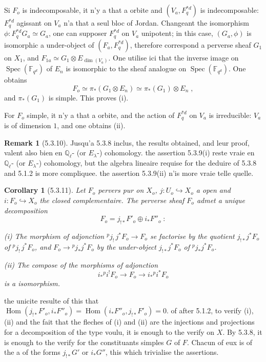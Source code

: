 \documentclass[12pt,a4paper]{article}
\theoremstyle{plain}
\newtheorem{corollary}[theorem]{Corollary}
\theoremstyle{definition}
\newtheorem{remark}[theorem]{Remark}
\theoremstyle{remark}
\DeclareMathOperator{\Hom}{Hom}
\DeclareMathOperator{\Spec}{Spec}
\newcommand{\FF}{\mathbb{F}}
\newcommand{\QQ}{\mathbb{Q}}
\begin{document}
Si $F_o$ is indecomposable, it n'y a that a orbite and $(V_a, F^{*d}_q)$ is indecomposable: $F^{*d}_q$ agissant on $V_a$ n'a that a seul bloc of Jordan. Changeant the isomorphism $\phi: F^{*d}_q G_a \simeq G_a$, one can supposer $F^{*d}_q$ on $V_a$ unipotent; in this case, $(G_a, \phi)$ is isomorphic a under-object of $(F_a, F^{*d}_q)$, therefore correspond a perverse sheaf $G_1$ on $X_1$, and $F_{1a} \simeq G_1 \otimes E_{\dim(V_a)}$. One utilise ici that the inverse image on $\Spec(\FF_{q^d})$ of $E_n$ is isomorphic to the sheaf analogue on $\Spec(\FF_{q^d})$. One obtains
\[
F_o \simeq \pi_*(G_1 \otimes E_n) \simeq \pi_*(G_1) \otimes E_n\;,
\]
and $\pi_*(G_1)$ is simple. This proves (i).

For $F_o$ simple, it n'y a that a orbite, and the action of $F^{*d}_q$ on $V_a$ is irreducible: $V_a$ is of dimension $1$, and one obtains (ii).

\begin{remark}[5.3.10]
Jusqu'a 5.3.8 inclus, the results obtained, and leur proof, valent also bien en $\QQ_{\ell}$- (or $E_{\lambda}$-) cohomology. the assertion 5.3.9(i) reste vraie en $\QQ_{\ell}$- (or $E_{\lambda}$-) cohomology, but the algebra lineaire requise for the deduire of 5.3.8 and 5.1.2 is more compliquee. the assertion 5.3.9(ii) n'is more vraie telle quelle.
\end{remark}

\begin{corollary}[5.3.11]
Let $F_o$ pervers pur on $X_o$, $j: U_o \hookrightarrow X_o$ a open and $i: F_o \hookrightarrow X_o$ the closed complementaire. The perverse sheaf $F_o$ admet a unique decomposition
\[
F_o = j_{!*}F'_o \oplus i_*F''_o\;:
\]

\emph{(i)} The morphism of adjonction ${}^{p}j_!\, j^*F_o \to F_o$ se factorise by the quotient $j_{!*}j^*F_o$ of ${}^{p}j_!\, j^*F_o$, and $F_o \to {}^{p}j_*j^*F_o$ by the under-object $j_{!*}j^*F_o$ of ${}^{p}j_*j^*F_o$.

\emph{(ii)} The compose of the morphisms of adjonction
\[
i_*{}^{p}i^!F_o \to F_o \to i_*{}^{p}i^*F_o
\]
is a isomorphism.
\end{corollary}

the unicite resulte of this that $\Hom(j_{!*}F'_o, i_*F''_o) = \Hom(i_*F''_o, j_{!*}F'_o) = 0$. of after 5.1.2, to verify (i), (ii) and the fait that the fleches of (i) and (ii) are the injections and projections for a decomposition of the type voulu, it is enough to the verify on $X$. By 5.3.8, it is enough to the verify for the constituants simples $G$ of $F$. Chacun of eux is of the a of the forms $j_{!*}G'$ or $i_*G''$, this which trivialise the assertions.
\end{document}
